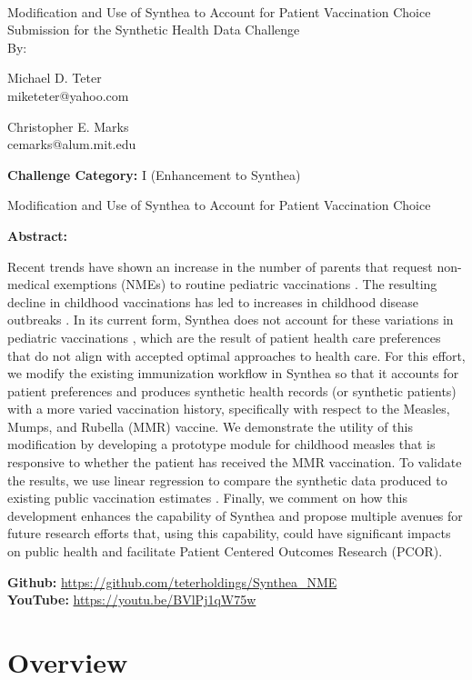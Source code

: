 \documentclass[12pt]{article}
\newcommand{\solutiontitle}{Modification and Use of Synthea to Account for Patient Vaccination Choice}
\newcommand{\challengecategory}{I (Enhancement to Synthea)}
\newcommand{\ABSTRACT}{
	Recent trends have shown an increase in the number of parents that request non-medical exemptions (NMEs) to routine pediatric vaccinations \cite{latimes-antivax,antivax}.  The resulting decline in childhood vaccinations has led to increases in childhood disease outbreaks \cite{antivax-data}.  In its current form, Synthea \cite{synthea} does not account for these variations in pediatric vaccinations \cite[p. 15]{challenge-webinar-slides}, which are the result of patient health care preferences that do not align with accepted optimal approaches to health care.  
    For this effort, we modify the existing immunization workflow in Synthea so that it accounts for patient preferences and produces synthetic health records (or synthetic patients) with a more varied vaccination history, specifically with respect to the Measles, Mumps, and Rubella (MMR) vaccine.  We demonstrate the utility of this modification by developing a prototype module for childhood measles that is responsive to whether the patient has received the MMR vaccination.  To validate the results, we use linear regression to compare the synthetic data produced to existing public vaccination estimates \cite{antivax-data}.  Finally, we comment on how this development enhances the capability of Synthea and propose multiple avenues for future research efforts that, using this capability, could have significant impacts on public health and facilitate Patient Centered Outcomes Research (PCOR).
}
\begin{document}

\thispagestyle{empty}

~

\begin{center}
    {\huge \solutiontitle} \\[24pt]
    {\Large Submission for the Synthetic Health Data Challenge} \\[24pt]
    {\Large By:} \\[24pt]
\end{center}

\begin{multicols}{2}
\begin{center}
	Michael D. Teter\\
	miketeter@yahoo.com
\end{center}

\columnbreak

\begin{center}
    Christopher E. Marks\\
    cemarks@alum.mit.edu
\end{center}
\end{multicols}



\noindent \textbf{Challenge Category:} \challengecategory
\\


\clearpage



\setcounter{page}{1}

\begin{center}
    {\LARGE \solutiontitle}
    \\[11pt]
    \begin{minipage}{0.9\textwidth}
      \textbf{Abstract:}
      \ABSTRACT
    \end{minipage}
\end{center}

\noindent \textbf{Github:} \url{https://github.com/teterholdings/Synthea_NME}\\
\noindent \textbf{YouTube:} \url{https://youtu.be/BVlPj1qW75w}
  
\section{Overview}
\end{document}
